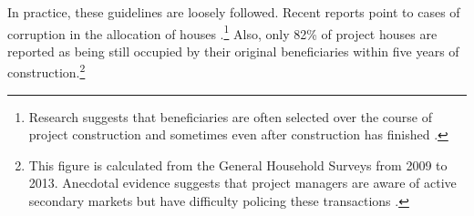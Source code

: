\documentclass[12pt]{article}
\begin{document}
In practice, these guidelines are loosely followed.  Recent reports point to cases of corruption in the allocation of houses \citep{seriq}.\footnote{Research suggests that beneficiaries are often selected over the course of project construction and sometimes even after construction has finished \citep{seriq}.}  Also, only 82\% of project houses are reported as being still occupied by their original beneficiaries within five years of construction.\footnote{This figure is calculated from the General Household Surveys from 2009 to 2013. Anecdotal evidence suggests that project managers are aware of active secondary markets but have difficulty policing these transactions \citep{resale}.} 





\end{document}
